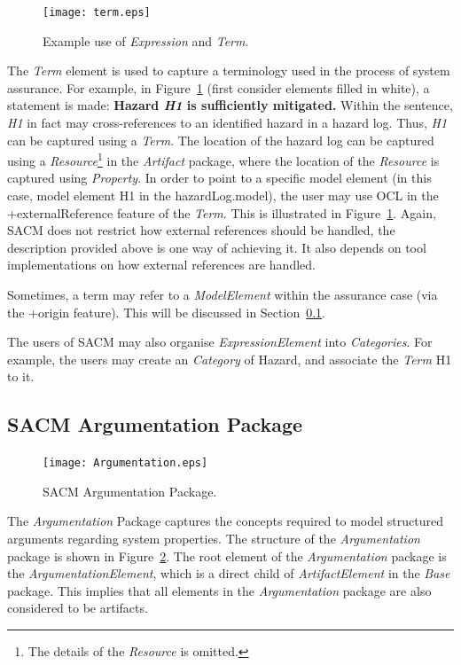 \begin{figure}
	\centering
	\texttt{[image: term.eps]}
	\caption{Example use of \textit{Expression} and \textit{Term}.}
	\label{fig:termExample}
\end{figure}

The \textit{Term} element is used to capture a terminology used in the process of system assurance. For example, in Figure~\ref{fig:termExample} (first consider elements filled in white), a statement is made: \textbf{Hazard \textit{H1} is sufficiently mitigated.} Within the sentence, \textit{H1} in fact may cross-references to an identified hazard in a hazard log. Thus, \textit{H1} can be captured using a \textit{Term}. 
The location of the hazard log can be captured using a \textit{Resource}\footnote{The details of the \textit{Resource} is omitted.} in the \textit{Artifact} package, where the location of the \textit{Resource} is captured using \textit{Property}. 
In order to point to a specific model element (in this case, model element H1 in the hazardLog.model), the user may use OCL in the +externalReference feature of the \textit{Term}. This is illustrated in Figure~\ref{fig:termExample}.
Again, SACM does not restrict how external references should be handled, the description provided above is one way of achieving it. It also depends on tool implementations on how external references are handled. 

Sometimes, a term may refer to a \textit{ModelElement} within the assurance case (via the +origin feature). This will be discussed in Section~\ref{sec:argPack}.

The users of SACM may also organise \textit{ExpressionElement} into \textit{Categories}. For example, the users may create an \textit{Category} of Hazard, and associate the \textit{Term} H1 to it. 
\subsection{SACM Argumentation Package}
\label{sec:argPack}
\begin{figure}
	\centering
	\texttt{[image: Argumentation.eps]}
	\caption{SACM Argumentation Package.}
	\label{fig:arg}
\end{figure}
The \textit{Argumentation} Package captures the concepts required to model structured arguments regarding system properties. The structure of the \textit{Argumentation} package is shown in Figure~\ref{fig:arg}.
The root element of the \textit{Argumentation} package is the \textit{ArgumentationElement}, which is a direct child of \textit{ArtifactElement} in the \textit{Base} package. This implies that all elements in the \textit{Argumentation} package are also considered to be artifacts. 

